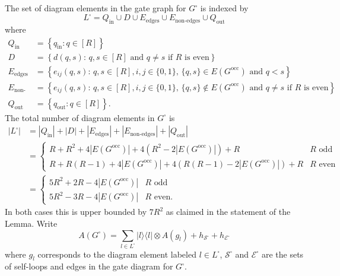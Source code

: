 \documentclass[../thesis-main/thesis-main]{subfiles}
\begin{document}
The set of diagram elements in the gate graph for $G^{\square}$ is indexed by
\begin{equation}
L^{\square}=Q_{\text{in}}\cup D\cup E_{\text{edges}}\cup E_{\text{non-edges}}\cup Q_{\text{out}}\label{eq:L_square}
\end{equation}
where
\begin{align}
Q_{\text{in}} & =\left\{ q_{\mathrm{in}}:q\in[R]\right\} \label{eq:Q_in}\\
D & =\left\{ d(q,s):\, q,s\in[R]\text{ and }q\neq s\text{ if }R\text{ is even}\right\} \label{eq:defn_of D}\\
E_{\text{edges}} & =\left\{ e_{ij}(q,s):\,q,s\in[R],  i,j\in\{0,1\},\,\{q,s\}\in E(G^{\text{occ}})\text{ and }q<s\right\} \nonumber \\
E_{\text{non-edges}} & =\left\{ e_{ij}(q,s):\, q,s\in[R], i,j\in\{0,1\},\,\{q,s\}\notin E(G^{\text{occ}})\text{ and }q\neq s\text{ if }R\text{ is even}\right\} \nonumber \\
Q_{\text{out}} & =\left\{ q_{\mathrm{out}}:q\in[R]\right\} .\label{eq:Q_out}
\end{align}
The total number of diagram elements in $G^{\square}$ is 
\begin{align}
|L^{\square}| & =|Q_{\text{in}}|+|D|+|E_{\text{edges}}|+|E_{\text{non-edges}}|+|Q_{\text{out}}|\\
 & =\begin{cases}
R+R^{2}+4|E(G^{\text{occ}})|+4\left(R^{2}-2|E(G^{\text{occ}})|\right)+R & R\text{ odd}\\
R+R\left(R-1\right)+4|E(G^{\text{occ}})|+4\left(R(R-1)-2|E(G^{\text{occ}})|\right)+R & R\text{ even}
\end{cases}\\
 & =\begin{cases}
5R^{2}+2R-4|E(G^{\text{occ}})| & R\text{ odd}\\
5R^{2}-3R-4|E(G^{\text{occ}})| & R\text{ even}.
\end{cases}
\end{align}
In both cases this is upper bounded by $7R^2$ as claimed in the statement of the Lemma. Write 
\begin{equation}
A(G^{\square})=\sum_{l\in L^{\square}}|l\rangle\langle l|\otimes A(g_{l})+h_{\mathcal{S}^{\square}}+h_{\mathcal{E}^{\square}}\label{eq:A_G_squAre}
\end{equation}
where $g_l$ corresponds to the diagram element labeled $l\in L^{\square}$, $\mathcal{S}^{\square}$ and $\mathcal{E}^{\square}$ are the sets of self-loops and edges in the gate diagram for $G^{\square}$. 
\end{document}
